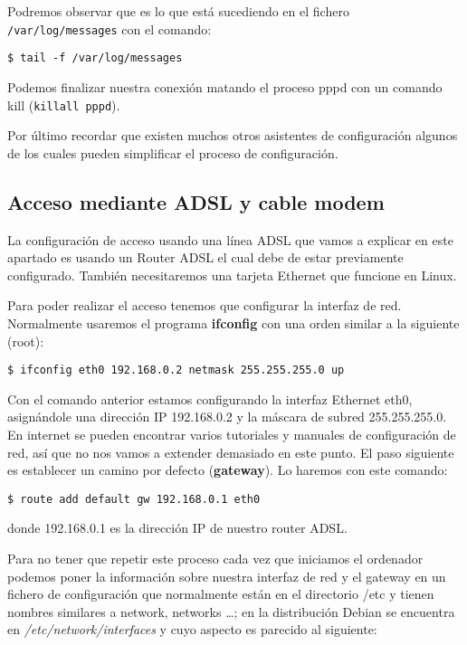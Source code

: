 Podremos  observar  que  es  lo  que está  sucediendo  en  el  fichero
{\tt /var/log/messages} con el comando:

\begin{verbatim}
$ tail -f /var/log/messages
\end{verbatim}

Podemos  finalizar nuestra  conexión matando  el proceso  pppd con  un
comando kill ({\tt killall pppd}).

Por   último  recordar   que  existen   muchos  otros   asistentes  de
configuración algunos de  los cuales pueden simplificar  el proceso de
configuración.

\subsection{Acceso mediante ADSL y cable modem}

La configuración de acceso usando una  línea ADSL que vamos a explicar
en  este apartado  es usando  un  Router ADSL  el cual  debe de  estar
previamente  configurado. También  necesitaremos una  tarjeta Ethernet
que funcione en Linux.

Para poder  realizar el acceso  tenemos que configurar la  interfaz de
red. Normalmente  usaremos el  programa {\bf  ifconfig} con  una orden
similar a la siguiente (root):

\begin{verbatim}
$ ifconfig eth0 192.168.0.2 netmask 255.255.255.0 up
\end{verbatim}

Con  el comando  anterior  estamos configurando  la interfaz  Ethernet
eth0, asignándole una dirección IP  192.168.0.2 y la máscara de subred
255.255.255.0.  En internet  se pueden  encontrar varios  tutoriales y
manuales de  configuración de  red, así  que no  nos vamos  a extender
demasiado en este punto. El paso siguiente es establecer un camino por
defecto ({\bf gateway}). Lo haremos con este comando:

\begin{verbatim}
$ route add default gw 192.168.0.1 eth0
\end{verbatim}

donde 192.168.0.1 es la dirección IP de nuestro router ADSL.

Para  no tener  que repetir  este proceso  cada vez  que iniciamos  el
ordenador  podemos  poner la  información  sobre  nuestra interfaz  de
red  y el  gateway  en  un fichero  de  configuración que  normalmente
están  en el  directorio /etc  y tienen  nombres similares  a network,
networks  \ldots;  en la  distribución  Debian  se encuentra  en  {\em
/etc/network/interfaces} y cuyo aspecto es parecido al siguiente:

